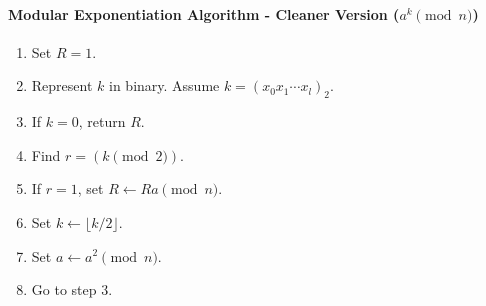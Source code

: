 \documentclass{subfile}
\begin{document}
	\paragraph{Modular Exponentiation Algorithm - Cleaner Version ($a^k\pmod n$)}
		\begin{enumerate}[1.]
			\item Set $R=1$.
			\item Represent $k$ in binary. Assume $k=(x_0x_1\cdots x_l)_2$.
			\item If $k=0$, return $R$.
			\item Find $r = (k\pmod2)$.
			\item If $r=1$, set $R\longleftarrow Ra\pmod n$.
			\item Set $k\longleftarrow \lfloor k/2\rfloor$.
			\item Set $a\longleftarrow a^2\pmod n$.
			\item Go to step $3$.
		\end{enumerate}
	
\end{document}

